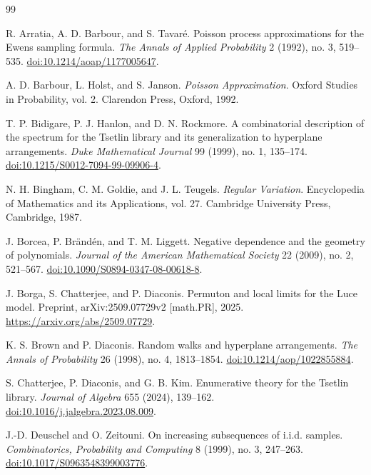\documentclass[11pt]{article}
\theoremstyle{remark}
\begin{document}
\begin{thebibliography}{99}

R. Arratia, A. D. Barbour, and S. Tavar\'e.
\newblock Poisson process approximations for the Ewens sampling formula.
\newblock \emph{The Annals of Applied Probability} 2 (1992), no. 3, 519--535.
\newblock \href{https://doi.org/10.1214/aoap/1177005647}
{doi:10.1214/aoap/1177005647}.

A. D. Barbour, L. Holst, and S. Janson.
\newblock \emph{Poisson Approximation}.
\newblock Oxford Studies in Probability, vol. 2.
\newblock Clarendon Press, Oxford, 1992.

T. P. Bidigare, P. J. Hanlon, and D. N. Rockmore.
\newblock A combinatorial description of the spectrum for the Tsetlin library
and its generalization to hyperplane arrangements.
\newblock \emph{Duke Mathematical Journal} 99 (1999), no. 1, 135--174.
\newblock \href{https://doi.org/10.1215/S0012-7094-99-09906-4}
{doi:10.1215/S0012-7094-99-09906-4}.

N. H. Bingham, C. M. Goldie, and J. L. Teugels.
\newblock \emph{Regular Variation}.
\newblock Encyclopedia of Mathematics and its Applications, vol. 27.
\newblock Cambridge University Press, Cambridge, 1987.

J. Borcea, P. Br\"and\'en, and T. M. Liggett.
\newblock Negative dependence and the geometry of polynomials.
\newblock \emph{Journal of the American Mathematical Society} 22 (2009),
no. 2, 521--567.
\newblock \href{https://doi.org/10.1090/S0894-0347-08-00618-8}
{doi:10.1090/S0894-0347-08-00618-8}.

J. Borga, S. Chatterjee, and P. Diaconis.
\newblock Permuton and local limits for the Luce model.
\newblock Preprint, arXiv:2509.07729v2 [math.PR], 2025.
\newblock \url{https://arxiv.org/abs/2509.07729}.

K. S. Brown and P. Diaconis.
\newblock Random walks and hyperplane arrangements.
\newblock \emph{The Annals of Probability} 26 (1998), no. 4, 1813--1854.
\newblock \href{https://doi.org/10.1214/aop/1022855884}
{doi:10.1214/aop/1022855884}.

S. Chatterjee, P. Diaconis, and G. B. Kim.
\newblock Enumerative theory for the Tsetlin library.
\newblock \emph{Journal of Algebra} 655 (2024), 139--162.
\newblock \href{https://doi.org/10.1016/j.jalgebra.2023.08.009}
{doi:10.1016/j.jalgebra.2023.08.009}.

J.-D. Deuschel and O. Zeitouni.
\newblock On increasing subsequences of i.i.d. samples.
\newblock \emph{Combinatorics, Probability and Computing} 8 (1999), no. 3,
247--263.
\newblock \href{https://doi.org/10.1017/S0963548399003776}
{doi:10.1017/S0963548399003776}.


\end{thebibliography}
\end{document}
